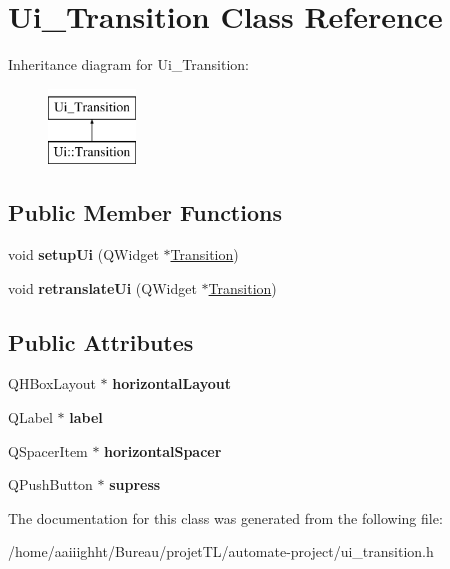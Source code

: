 \hypertarget{class_ui___transition}{\section{Ui\-\_\-\-Transition Class Reference}
\label{class_ui___transition}
}
Inheritance diagram for Ui\-\_\-\-Transition\-:\begin{figure}[H]
\begin{center}
\leavevmode
\includegraphics[height=2.000000cm]{class_ui___transition}
\end{center}
\end{figure}
\subsection*{Public Member Functions}
\begin{DoxyCompactItemize}
\item 
\hypertarget{class_ui___transition_a06f0129cc1a15bc1c50b55447578b1c5}{void {\bfseries setup\-Ui} (Q\-Widget $\ast$\hyperlink{class_transition}{Transition})}\label{class_ui___transition_a06f0129cc1a15bc1c50b55447578b1c5}

\item 
\hypertarget{class_ui___transition_ad9e6b3650adf1487f6d51e7c5d340427}{void {\bfseries retranslate\-Ui} (Q\-Widget $\ast$\hyperlink{class_transition}{Transition})}\label{class_ui___transition_ad9e6b3650adf1487f6d51e7c5d340427}

\end{DoxyCompactItemize}
\subsection*{Public Attributes}
\begin{DoxyCompactItemize}
\item 
\hypertarget{class_ui___transition_a4635f8a22e46362c42b1cf06bcd9b1cb}{Q\-H\-Box\-Layout $\ast$ {\bfseries horizontal\-Layout}}\label{class_ui___transition_a4635f8a22e46362c42b1cf06bcd9b1cb}

\item 
\hypertarget{class_ui___transition_a409e71244dde25cd75d063acfc56c534}{Q\-Label $\ast$ {\bfseries label}}\label{class_ui___transition_a409e71244dde25cd75d063acfc56c534}

\item 
\hypertarget{class_ui___transition_a0277cdf754c92b30522232be1bd05969}{Q\-Spacer\-Item $\ast$ {\bfseries horizontal\-Spacer}}\label{class_ui___transition_a0277cdf754c92b30522232be1bd05969}

\item 
\hypertarget{class_ui___transition_ab06520280ed48b79ae0878c5061767c8}{Q\-Push\-Button $\ast$ {\bfseries supress}}\label{class_ui___transition_ab06520280ed48b79ae0878c5061767c8}

\end{DoxyCompactItemize}


The documentation for this class was generated from the following file\-:\begin{DoxyCompactItemize}
\item 
/home/aaiiighht/\-Bureau/projet\-T\-L/automate-\/project/ui\-\_\-transition.\-h\end{DoxyCompactItemize}

